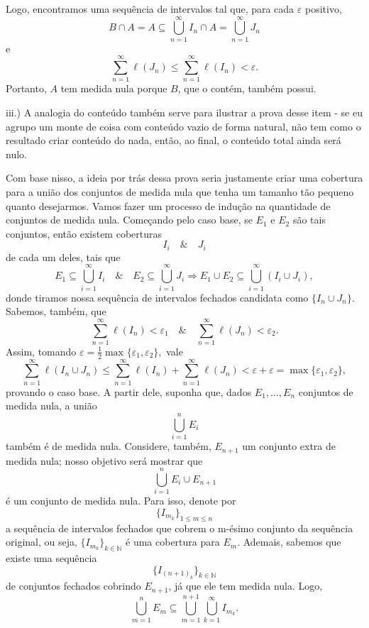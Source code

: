 \documentclass[../analysisII_notes.tex]{subfiles}
\begin{document}
\begin{proof*}
	Logo, encontramos uma sequência de intervalos tal que, para cada \(\varepsilon \) positivo,
	\[
		B\cap A = A \subseteq \bigcup_{n=1}^{\infty}I_{n}\cap A = \bigcup_{n=1}^{\infty}J_{n}
	\]
	e
	\[
		\sum\limits_{n=1}^{\infty}\ell (J_{n})\leq \sum\limits_{n=1}^{\infty}\ell (I_{n})<\varepsilon .
	\]
	Portanto, \(A\) tem medida nula porque \(B\), que o contém, também possui.

	iii.) A analogia do conteúdo também serve para ilustrar a prova desse item - se eu agrupo um monte de coisa com conteúdo vazio de forma natural, não tem como o resultado criar conteúdo do nada, então, ao final, o conteúdo total ainda será nulo.

	Com base nisso, a ideia por trás dessa prova seria justamente criar uma cobertura para a união dos conjuntos de medida nula que tenha um tamanho tão pequeno quanto desejarmos. Vamos fazer um processo de indução na quantidade de conjuntos de medida nula. Começando pelo caso base, se \(E_1\) e \(E_2\) são tais conjuntos, então existem coberturas
	\[
		I_{i} \quad\&\quad J_{i}
	\]
	de cada um deles, tais que
	\[
		E_1 \subseteq \bigcup_{i=1}^{\infty}I_{i} \quad\&\quad E_2 \subseteq \bigcup_{i=1}^{\infty}J_{i} \Rightarrow E_{1}\cup E_{2}\subseteq \bigcup_{i=1}^{\infty}(I_{i}\cup J_{i}),
	\]
	donde tiramos nossa sequência de intervalos fechados candidata como \(\{I_{n}\cup J_{n}\}\). Sabemos, também, que
	\[
		\sum\limits_{n=1}^{\infty}\ell (I_{n}) < \varepsilon _1 \quad\&\quad \sum\limits_{n=1}^{\infty}\ell (J_{n}) <\varepsilon_{2}.
	\]
	Assim, tomando \(\varepsilon = \frac{1}{2}\max_{}\{\varepsilon_1, \varepsilon_2\},\) vale
	\[
		\sum\limits_{n=1}^{\infty}\ell (I_{n}\cup J_{n}) \leq \sum\limits_{n=1}^{\infty}\ell (I_{n}) + \sum\limits_{n=1}^{\infty}\ell (J_{n}) < \varepsilon +\varepsilon = \max_{}\{\varepsilon_1, \varepsilon_2\},
	\]
	provando o caso base. A partir dele, suponha que, dados \(E_1,\dotsc , E_{n}\) conjuntos de medida nula, a união
	\[
		\bigcup_{i=1}^{n}E_{i}
	\]
	também é de medida nula. Considere, também, \(E_{n+1}\) um conjunto extra de medida nula; nosso objetivo será mostrar que
	\[
		\bigcup_{i=1}^{n}E_{i}\cup E_{n+1}
	\]
	é um conjunto de medida nula. Para isso, denote por
	\[
		\{I_{m_{k}}\}_{1\leq m\leq n}
	\]
	a sequência de intervalos fechados que cobrem o m-ésimo conjunto da sequência original, ou seja, \(\{I_{m_{k}}\}_{k\in \mathbb{N}}\) é uma cobertura para \(E_{m}\). Ademais, sabemos que existe uma sequência
	\[
		\{I_{(n+1)_{k}}\}_{k\in \mathbb{N}}
	\]
	de conjuntos fechados cobrindo \(E_{n+1}\), já que ele tem medida nula. Logo,
	\[
		\bigcup_{m=1}^{n}E_{m}\subseteq \bigcup_{m=1}^{n+1}\bigcup_{k=1}^{\infty}I_{m_{k}}.
\]
\end{proof*}
\end{document}
